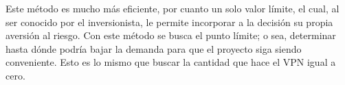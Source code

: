 Este método es mucho más eficiente, por cuanto un solo valor límite, el cual, al ser
conocido por el inversionista, le permite incorporar a la decisión su propia aversión al riesgo.
Con este método se busca el punto límite; o sea, determinar hasta dónde podría bajar la
demanda para que el proyecto siga siendo conveniente. Esto es lo mismo que buscar la
cantidad que hace el VPN igual a cero.

